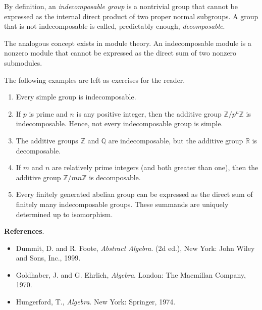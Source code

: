 \documentclass[12pt]{article}
\begin{document}
By definition, an \emph{indecomposable group} is a nontrivial group that cannot be expressed as the internal direct product of two proper normal subgroups. A group that is not indecomposable is called, predictably enough, \emph{decomposable}.

The analogous concept exists in module theory. An indecomposable module is a nonzero module that cannot be expressed as the direct sum of two nonzero submodules.

The following examples are left as exercises for the reader.
\begin{enumerate}
\item Every simple group is indecomposable.
\item If $p$ is prime and $n$ is any positive integer, then the additive group $\mathbb{Z}/p^n\mathbb{Z}$ is indecomposable. Hence, not every indecomposable group is simple.
\item The additive groups $\mathbb{Z}$ and $\mathbb{Q}$ are indecomposable, but the additive group $\mathbb{R}$ is decomposable.
\item If $m$ and $n$ are relatively prime integers (and both greater than one), then the additive group $\mathbb{Z}/mn\mathbb{Z}$ is decomposable.
\item Every finitely generated abelian group can be expressed as the direct sum of finitely many indecomposable groups. These summands are uniquely determined up to isomorphism.
\end{enumerate}

{\bf References}.
\begin{itemize}
\item Dummit, D. and R. Foote, \emph{Abstract Algebra}. (2d ed.), New York: John Wiley and Sons, Inc., 1999.
\item Goldhaber, J. and G. Ehrlich, \emph{Algebra}. London: The Macmillan Company, 1970.
\item Hungerford, T., \emph{Algebra}. New York: Springer, 1974.
\end{itemize}
\end{document}
